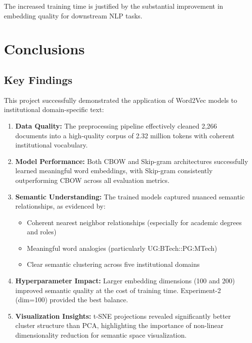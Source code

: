 \documentclass[11pt,a4paper]{report}
\begin{document}
The increased training time is justified by the substantial improvement in embedding quality for downstream NLP tasks.

\newpage

\chapter{Conclusions}

\section{Key Findings}

This project successfully demonstrated the application of Word2Vec models to institutional domain-specific text:

\begin{enumerate}
    \item \textbf{Data Quality:} The preprocessing pipeline effectively cleaned 2,266 documents into a high-quality corpus of 2.32 million tokens with coherent institutional vocabulary.
    
    \item \textbf{Model Performance:} Both CBOW and Skip-gram architectures successfully learned meaningful word embeddings, with Skip-gram consistently outperforming CBOW across all evaluation metrics.
    
    \item \textbf{Semantic Understanding:} The trained models captured nuanced semantic relationships, as evidenced by:
    \begin{itemize}
        \item Coherent nearest neighbor relationships (especially for academic degrees and roles)
        \item Meaningful word analogies (particularly UG:BTech::PG:MTech)
        \item Clear semantic clustering across five institutional domains
    \end{itemize}
    
    \item \textbf{Hyperparameter Impact:} Larger embedding dimensions (100 and 200) improved semantic quality at the cost of training time. Experiment-2 (dim=100) provided the best balance.
    
    \item \textbf{Visualization Insights:} t-SNE projections revealed significantly better cluster structure than PCA, highlighting the importance of non-linear dimensionality reduction for semantic space visualization.
\end{enumerate}
\end{document}
